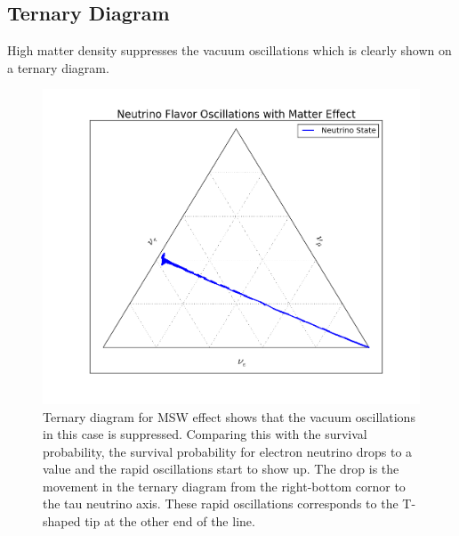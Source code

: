 \documentclass[letterpaper,12pt,english]{sphinxmanual}
\begin{document}
\subsection{Ternary Diagram}
\label{msw:ternary-diagram}
High matter density suppresses the vacuum oscillations which is clearly shown on a ternary diagram.
\begin{figure}[htbp]
\centering
\capstart

\includegraphics{mass-1.png}
\caption{Ternary diagram for MSW effect shows that the vacuum oscillations in this case is suppressed. Comparing this with the survival probability, the survival probability for electron neutrino drops to a value and the rapid oscillations start to show up. The drop is the movement in the ternary diagram from the right-bottom cornor to the tau neutrino axis. These rapid oscillations corresponds to the T-shaped tip at the other end of the line.}\end{figure}
\end{document}
